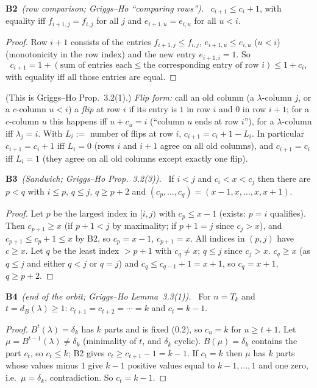 \documentclass[11pt]{article}
\newcommand{\step}[2]{\par\medskip\noindent\textbf{#1}\ \textit{#2}\ }
\newcommand{\dB}{d_B}
\begin{document}
\step{B2}{(row comparison; Griggs--Ho ``comparing rows'').} $c_{i+1}\le c_i+1$, with equality iff $f_{i+1,j}=f_{i,j}$ for all $j$ and $e_{i+1,u}=e_{i,u}$ for all $u<i$.
\begin{proof} Row $i+1$ consists of the entries $f_{i+1,j}\le f_{i,j}$, $e_{i+1,u}\le e_{i,u}$ ($u<i$) (monotonicity in the row index) and the new entry $e_{i+1,i}=1$. So
\[c_{i+1}=1+(\text{sum of entries each}\le\text{the corresponding entry of row }i)\le1+c_i,\]
with equality iff all those entries are equal. \end{proof}
(This is Griggs--Ho Prop.~3.2(1).)
\emph{Flip form:} call an old column (a $\lambda$-column $j$, or a $c$-column $u<i$) a \emph{flip} at row $i$ if its entry is $1$ in row $i$ and $0$ in row $i+1$; for a $c$-column $u$ this happens iff $u+c_u=i$ (``column $u$ ends at row $i$''), for a $\lambda$-column iff $\lambda_j=i$. With $L_i:=$ number of flips at row $i$, $c_{i+1}=c_i+1-L_i$. In particular $c_{i+1}=c_i+1$ iff $L_i=0$ (rows $i$ and $i+1$ agree on all old columns), and $c_{i+1}=c_i$ iff $L_i=1$ (they agree on all old columns except exactly one flip).

\step{B3}{(Sandwich; Griggs--Ho Prop.~3.2(3)).} If $i<j$ and $c_i<x<c_j$ then there are $p<q$ with $i\le p$, $q\le j$, $q\ge p+2$ and $(c_p,\ldots,c_q)=(x-1,x,\ldots,x,x+1)$.
\begin{proof} Let $p$ be the largest index in $[i,j)$ with $c_p\le x-1$ (exists: $p=i$ qualifies). Then $c_{p+1}\ge x$ (if $p+1<j$ by maximality; if $p+1=j$ since $c_j>x$), and $c_{p+1}\le c_p+1\le x$ by B2, so $c_p=x-1$, $c_{p+1}=x$. All indices in $(p,j)$ have $c\ge x$. Let $q$ be the least index $>p+1$ with $c_q\ne x$; $q\le j$ since $c_j>x$. $c_q\ge x$ (as $q\le j$ and either $q<j$ or $q=j$) and $c_q\le c_{q-1}+1=x+1$, so $c_q=x+1$, $q\ge p+2$. \end{proof}

\step{B4}{(end of the orbit; Griggs--Ho Lemma~3.3(1)).} For $n=T_k$ and $t=\dB(\lambda)\ge1$: $c_{t+1}=c_{t+2}=\cdots=k$ and $c_t=k-1$.
\begin{proof} $B^t(\lambda)=\delta_k$ has $k$ parts and is fixed (0.2), so $c_u=k$ for $u\ge t+1$. Let $\mu=B^{t-1}(\lambda)\ne\delta_k$ (minimality of $t$, and $\delta_k$ cyclic). $B(\mu)=\delta_k$ contains the part $c_t$, so $c_t\le k$; B2 gives $c_t\ge c_{t+1}-1=k-1$. If $c_t=k$ then $\mu$ has $k$ parts whose values minus $1$ give $k-1$ positive values equal to $k-1,\ldots,1$ and one zero, i.e.\ $\mu=\delta_k$, contradiction. So $c_t=k-1$. \end{proof}
\end{document}
